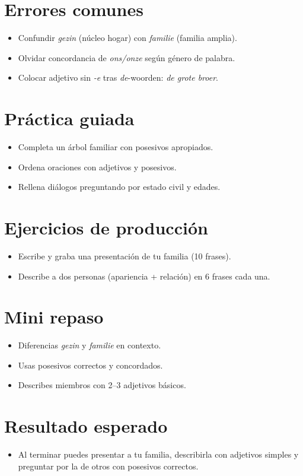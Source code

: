 \section{Errores comunes}
\begin{itemize}[leftmargin=*]
	\item Confundir \textit{gezin} (núcleo hogar) con \textit{familie} (familia amplia).
	\item Olvidar concordancia de \textit{ons/onze} según género de palabra.
	\item Colocar adjetivo sin \textit{-e} tras \textit{de}-woorden: \textit{de grote broer}.
\end{itemize}

\section{Práctica guiada}
\begin{itemize}[leftmargin=*]
	\item Completa un árbol familiar con posesivos apropiados.
	\item Ordena oraciones con adjetivos y posesivos.
	\item Rellena diálogos preguntando por estado civil y edades.
\end{itemize}

\section{Ejercicios de producción}
\begin{itemize}[leftmargin=*]
	\item Escribe y graba una presentación de tu familia (10 frases).
	\item Describe a dos personas (apariencia + relación) en 6 frases cada una.
\end{itemize}

\section{Mini repaso}
\begin{itemize}[leftmargin=*]
	\item Diferencias \textit{gezin} y \textit{familie} en contexto.
	\item Usas posesivos correctos y concordados.
	\item Describes miembros con 2–3 adjetivos básicos.
\end{itemize}

\section{Resultado esperado}
\begin{itemize}[leftmargin=*]
	\item Al terminar puedes presentar a tu familia, describirla con adjetivos simples y preguntar por la de otros con posesivos correctos.
\end{itemize}


